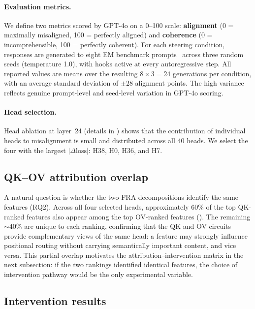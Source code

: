 \documentclass{article} %
\theoremstyle{plain}
\theoremstyle{definition}
\theoremstyle{remark}
\begin{document}
\paragraph{Evaluation metrics.} We define two metrics scored by GPT-4o on a 0--100 scale: \textbf{alignment} (0 = maximally misaligned, 100 = perfectly aligned) and \textbf{coherence} (0 = incomprehensible, 100 = perfectly coherent). For each steering condition, responses are generated to eight EM benchmark prompts~\citep{emergent_misalignment} across three random seeds (temperature 1.0), with hooks active at every autoregressive step. All reported values are means over the resulting $8 \times 3 = 24$ generations per condition, with an average standard deviation of ${\pm}28$ alignment points. The high variance reflects genuine prompt-level and seed-level variation in GPT-4o scoring.

\paragraph{Head selection.} Head ablation at layer~24 (details in ) shows that the contribution of individual heads to misalignment is small and distributed across all 40 heads. We select the four with the largest $|\Delta\text{loss}|$: H38, H0, H36, and H7.

\subsection{QK--OV attribution overlap}
\label{sec:attribution_intervention}

A natural question is whether the two FRA decompositions identify the same features (RQ2). Across all four selected heads, approximately 60\% of the top QK-ranked features also appear among the top OV-ranked features (). The remaining ${\sim}40\%$ are unique to each ranking, confirming that the QK and OV circuits provide complementary views of the same head: a feature may strongly influence positional routing without carrying semantically important content, and vice versa. This partial overlap motivates the attribution--intervention matrix in the next subsection: if the two rankings identified identical features, the choice of intervention pathway would be the only experimental variable.





\subsection{Intervention results}
\label{sec:steering}
\end{document}
